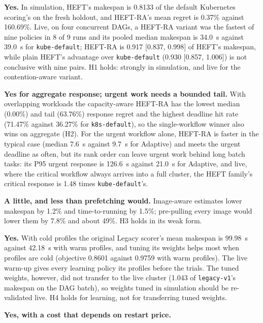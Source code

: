 \documentclass[12pt,a4paper]{report}
\newcommand{\pol}[1]{\texttt{#1}}
\begin{document}
\begin{description}[leftmargin=1.2cm,style=nextline]
\item[RQ1] \textbf{Yes.} In simulation, HEFT's makespan is 0.8133 of the
      default Kubernetes scoring's on the fresh holdout, and HEFT-RA's mean
      regret is 0.37\% against 160.69\%. Live, on four concurrent DAGs, a
      HEFT-RA variant was the fastest of nine policies in 8 of 9 runs and
      its pooled median makespan is 34.0~s against 39.0~s for
      \pol{kube-default}; HEFT-RA is 0.917 [0.837, 0.998] of HEFT's
      makespan, while plain HEFT's advantage over \pol{kube-default}
      (0.930 [0.857, 1.006]) is not conclusive with nine pairs. H1 holds:
      strongly in simulation, and live for the contention-aware variant.
\item[RQ2] \textbf{Yes for aggregate response; urgent work needs a
      bounded tail.} With overlapping workloads the capacity-aware HEFT-RA
      has the lowest median (0.00\%) and tail (63.76\%) response regret and
      the highest deadline hit rate (71.47\% against 36.27\% for
      \pol{k8s-default}), so the single-workflow winner also wins on
      aggregate (H2). For the urgent workflow alone, HEFT-RA is faster in
      the typical case (median 7.6~s against 9.7~s for Adaptive) and meets
      the urgent deadline as often, but its rank order can leave urgent
      work behind long batch tasks: its P95 urgent response is 126.6~s
      against 21.0~s for Adaptive, and live, where the critical workflow
      always arrives into a full cluster, the HEFT family's critical
      response is 1.48 times \pol{kube-default}'s.
\item[RQ3] \textbf{A little, and less than prefetching would.} Image-aware
      estimates lower makespan by 1.2\% and time-to-running by 1.5\%;
      pre-pulling every image would lower them by 7.8\% and about 49\%.
      H3 holds in its weak form.
\item[RQ4] \textbf{Yes.} With cold profiles the original Legacy scorer's
      mean makespan is 99.98~s against 42.18~s with warm profiles, and
      tuning its weights helps most when profiles are cold (objective
      0.8601 against 0.9759 with warm profiles). The live warm-up gives
      every learning policy its profiles before the trials. The tuned
      weights, however, did not transfer to the live cluster (1.043 of
      \pol{legacy-v1}'s makespan on the DAG batch), so weights tuned in
      simulation should be re-validated live. H4 holds for learning, not
      for transferring tuned weights.
\item[RQ5] \textbf{Yes, with a cost that depends on restart price.}

\end{description}
\end{document}
